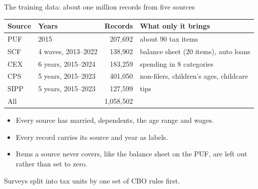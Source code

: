 \documentclass[11pt,aspectratio=169]{beamer}
\newcommand{\slidenote}[1]{\par\vfill{\scriptsize\color{yalegrey}#1}}
\begin{document}
\begin{frame}{The training data: about one million records from five sources}
  \centering\small
  \renewcommand{\arraystretch}{1.15}
  \begin{tabular}{llrl}
    \toprule
    Source & Years & Records & What only it brings \\
    \midrule
    PUF  & 2015                  & 207,692 & about 90 tax items \\
    SCF  & 4 waves, 2013--2022    & 138,902 & balance sheet (20 items), auto loans \\
    CEX  & 6 years, 2015--2024    & 183,259 & spending in 8 categories \\
    CPS  & 5 years, 2015--2023    & 401,050 & non-filers, children's ages, childcare \\
    SIPP & 5 years, 2015--2023    & 127,599 & tips \\
    \midrule
    All  &                              & 1,058,502 & \\
    \bottomrule
  \end{tabular}

  \vspace{1em}
  \begin{itemize}
    \item Every source has married, dependents, the age range and wages.
    \item Every record carries its source and year as labels.
    \item Items a source never covers, like the balance sheet on the PUF, are left out rather than set to zero.
  \end{itemize}
  \slidenote{Surveys split into tax units by one set of CBO rules first.}
\end{frame}
\end{document}
